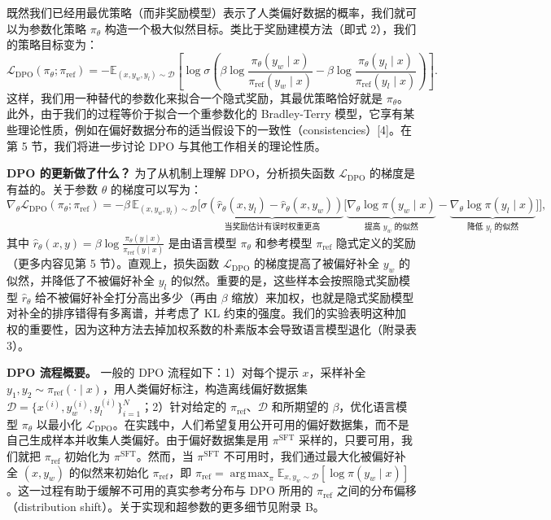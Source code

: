 \documentclass[11pt,UTF8,fontset=fandol]{ctexart}
\DeclareMathOperator*{\argmax}{arg\,max}
\newcommand{\sref}{\mathrm{ref}}
\newcommand{\ssft}{\mathrm{SFT}}
\begin{document}
既然我们已经用最优策略（而非奖励模型）表示了人类偏好数据的概率，我们就可以为参数化策略 $\pi_\theta$ 构造一个极大似然目标。类比于奖励建模方法（即式 2），我们的策略目标变为：
\begin{equation}
\mathcal{L}_{\mathrm{DPO}}(\pi_\theta; \pi_\sref) = -\mathbb{E}_{(x, y_w, y_l) \sim \mathcal{D}}\left[\log \sigma\left(\beta \log \frac{\pi_\theta(y_w \mid x)}{\pi_\sref(y_w \mid x)} - \beta \log \frac{\pi_\theta(y_l \mid x)}{\pi_\sref(y_l \mid x)}\right)\right]. \tag{7}
\end{equation}
这样，我们用一种替代的参数化来拟合一个隐式奖励，其最优策略恰好就是 $\pi_\theta$。此外，由于我们的过程等价于拟合一个重参数化的 Bradley-Terry 模型，它享有某些理论性质，例如在偏好数据分布的适当假设下的一致性（consistencies）[4]。在第 5 节，我们将进一步讨论 DPO 与其他工作相关的理论性质。

\textbf{DPO 的更新做了什么？} 为了从机制上理解 DPO，分析损失函数 $\mathcal{L}_{\mathrm{DPO}}$ 的梯度是有益的。关于参数 $\theta$ 的梯度可以写为：
\[
\nabla_\theta \mathcal{L}_{\mathrm{DPO}}(\pi_\theta; \pi_\sref) = -\beta\, \mathbb{E}_{(x, y_w, y_l) \sim \mathcal{D}}\Big[
\underbrace{\sigma\!\left(\hat{r}_\theta(x, y_l) - \hat{r}_\theta(x, y_w)\right)}_{\text{当奖励估计有误时权重更高}}
\big[
\underbrace{\nabla_\theta \log \pi(y_w \mid x)}_{\text{提高 } y_w \text{ 的似然}}
- \underbrace{\nabla_\theta \log \pi(y_l \mid x)}_{\text{降低 } y_l \text{ 的似然}}
\big]
\Big],
\]
其中 $\hat{r}_\theta(x, y) = \beta \log \frac{\pi_\theta(y \mid x)}{\pi_\sref(y \mid x)}$ 是由语言模型 $\pi_\theta$ 和参考模型 $\pi_\sref$ 隐式定义的奖励（更多内容见第 5 节）。直观上，损失函数 $\mathcal{L}_{\mathrm{DPO}}$ 的梯度提高了被偏好补全 $y_w$ 的似然，并降低了不被偏好补全 $y_l$ 的似然。重要的是，这些样本会按照隐式奖励模型 $\hat{r}_\theta$ 给不被偏好补全打分高出多少（再由 $\beta$ 缩放）来加权，也就是隐式奖励模型对补全的排序错得有多离谱，并考虑了 KL 约束的强度。我们的实验表明这种加权的重要性，因为这种方法去掉加权系数的朴素版本会导致语言模型退化（附录表 3）。

\textbf{DPO 流程概要。} 一般的 DPO 流程如下：1）对每个提示 $x$，采样补全 $y_1, y_2 \sim \pi_\sref(\cdot \mid x)$，用人类偏好标注，构造离线偏好数据集 $\mathcal{D} = \{x^{(i)}, y_w^{(i)}, y_l^{(i)}\}_{i=1}^N$；2）针对给定的 $\pi_\sref$、$\mathcal{D}$ 和所期望的 $\beta$，优化语言模型 $\pi_\theta$ 以最小化 $\mathcal{L}_{\mathrm{DPO}}$。在实践中，人们希望复用公开可用的偏好数据集，而不是自己生成样本并收集人类偏好。由于偏好数据集是用 $\pi^{\ssft}$ 采样的，只要可用，我们就把 $\pi_\sref$ 初始化为 $\pi^{\ssft}$。然而，当 $\pi^{\ssft}$ 不可用时，我们通过最大化被偏好补全 $(x, y_w)$ 的似然来初始化 $\pi_\sref$，即 $\pi_\sref = \argmax_\pi \mathbb{E}_{x, y_w \sim \mathcal{D}}[\log \pi(y_w \mid x)]$。这一过程有助于缓解不可用的真实参考分布与 DPO 所用的 $\pi_\sref$ 之间的分布偏移（distribution shift）。关于实现和超参数的更多细节见附录 B。
\end{document}
